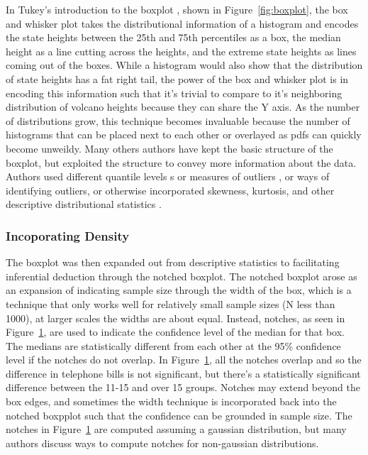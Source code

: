 \documentclass[../main.tex]{subfiles}
\begin{document}
In Tukey's introduction to the boxplot \cite{tukey1977}, shown in
Figure~\ref{fig:boxplot}, the box and whisker plot takes the distributional information of a histogram and encodes the state heights between the
25th and 75th percentiles as a box, the median height as a line cutting across
the heights, and the extreme state heights as lines coming out of the
boxes. While a histogram would also show that the distribution of state heights has a fat right tail,
the power of the box and whisker plot is in encoding this information such that
it's trivial to compare to it's neighboring distribution of volcano
heights because they can share the Y axis. As the number of distributions grow,
this technique becomes invaluable because the number of histograms that can be
placed next to each other or overlayed as pdfs can quickly become
unweildy.  Many others authors have kept the basic structure of the boxplot,
but exploited the structure to convey more information about the data. Authors
used different quantile levels \cite{hyndman1996}s or measures of outliers
\cite{frigge1989}, or ways of identifying outliers\cite{carter2009, schwertman2004, schwertman2007}, or otherwise incorporated skewness,
kurtosis, and other descriptive distributional statistics \cite{kim2004, hubert2008, marmolejo2015}.

\subsubsection{Incoporating Density}

\begin{figure}
\label{fig:notched}
\end{figure}
The boxplot was then expanded out from descriptive statistics to facilitating
inferential deduction through the notched boxplot. \cite{mcgill1978} The notched boxplot
arose as an expansion of indicating sample size through the width of the box,
which is a technique that only works well for relatively small sample sizes (N
less than 1000), at larger scales the widths are about equal. Instead, notches, as seen
in Figure~\ref{fig:notched}, are used to indicate the confidence level of the
median for that box. The medians are statistically different from each other at
the 95\% confidence level if the notches do not overlap. In
Figure~\ref{fig:notched}, all the notches overlap %
and so the difference in telephone bills is not significant, but there's a
statistically significant difference between the 11-15 and over 15 groups. Notches may extend
beyond the box edges, and sometimes the width technique is incorporated back
into the notched boxpplot such that the confidence can be grounded in sample
size. The notches in Figure~\ref{fig:notched} are computed assuming a gaussian
distribution, but many authors \cite{x,y,z} discuss ways to compute notches for
non-gaussian distributions. 
\end{document}
